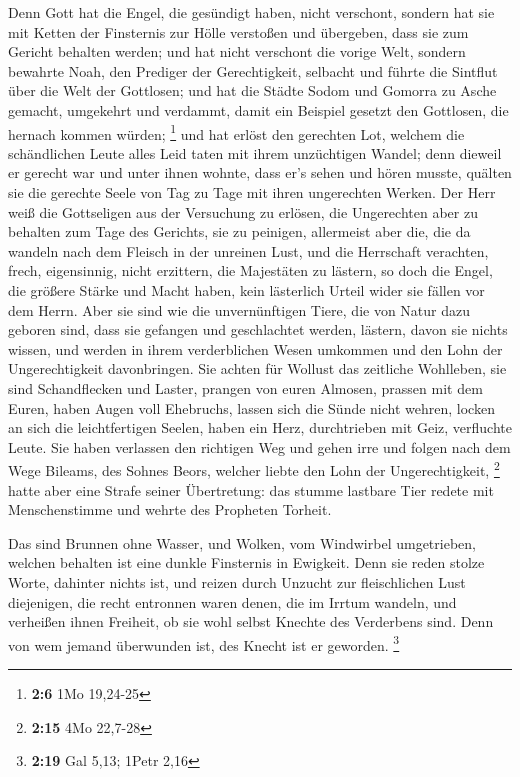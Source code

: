  Denn Gott hat die Engel, die gesündigt haben, nicht
verschont, sondern hat sie mit Ketten der Finsternis zur Hölle verstoßen
und übergeben, dass sie zum Gericht behalten werden;  und
hat nicht verschont die vorige Welt, sondern bewahrte Noah, den Prediger
der Gerechtigkeit, selbacht und führte die Sintflut über die Welt der
Gottlosen;  und hat die Städte Sodom und Gomorra zu Asche
gemacht, umgekehrt und verdammt, damit ein Beispiel gesetzt den
Gottlosen, die hernach kommen würden; \footnote{\textbf{2:6} 1Mo
  19,24-25}  und hat erlöst den gerechten Lot, welchem die
schändlichen Leute alles Leid taten mit ihrem unzüchtigen Wandel;
 denn dieweil er gerecht war und unter ihnen wohnte, dass
er's sehen und hören musste, quälten sie die gerechte Seele von Tag zu
Tage mit ihren ungerechten Werken.  Der Herr weiß die
Gottseligen aus der Versuchung zu erlösen, die Ungerechten aber zu
behalten zum Tage des Gerichts, sie zu peinigen, 
allermeist aber die, die da wandeln nach dem Fleisch in der unreinen
Lust, und die Herrschaft verachten, frech, eigensinnig, nicht erzittern,
die Majestäten zu lästern,  so doch die Engel, die
größere Stärke und Macht haben, kein lästerlich Urteil wider sie fällen
vor dem Herrn.  Aber sie sind wie die unvernünftigen
Tiere, die von Natur dazu geboren sind, dass sie gefangen und
geschlachtet werden, lästern, davon sie nichts wissen, und werden in
ihrem verderblichen Wesen umkommen  und den Lohn der
Ungerechtigkeit davonbringen. Sie achten für Wollust das zeitliche
Wohlleben, sie sind Schandflecken und Laster, prangen von euren Almosen,
prassen mit dem Euren,  haben Augen voll Ehebruchs,
lassen sich die Sünde nicht wehren, locken an sich die leichtfertigen
Seelen, haben ein Herz, durchtrieben mit Geiz, verfluchte Leute.
 Sie haben verlassen den richtigen Weg und gehen irre und
folgen nach dem Wege Bileams, des Sohnes Beors, welcher liebte den Lohn
der Ungerechtigkeit, \footnote{\textbf{2:15} 4Mo 22,7-28}
 hatte aber eine Strafe seiner Übertretung: das stumme
lastbare Tier redete mit Menschenstimme und wehrte des Propheten
Torheit.

 Das sind Brunnen ohne Wasser, und Wolken, vom Windwirbel
umgetrieben, welchen behalten ist eine dunkle Finsternis in Ewigkeit.
 Denn sie reden stolze Worte, dahinter nichts ist, und
reizen durch Unzucht zur fleischlichen Lust diejenigen, die recht
entronnen waren denen, die im Irrtum wandeln,  und
verheißen ihnen Freiheit, ob sie wohl selbst Knechte des Verderbens
sind. Denn von wem jemand überwunden ist, des Knecht ist er geworden.
\footnote{\textbf{2:19} Gal 5,13; 1Petr 2,16}


